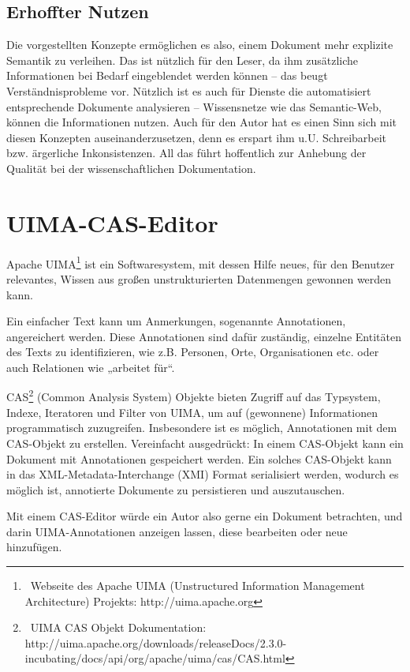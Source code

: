 \subsection{Erhoffter Nutzen}\label{}
 
Die vorgestellten Konzepte ermöglichen es also, einem Dokument mehr explizite Semantik zu verleihen. Das ist nützlich für den Leser, da ihm zusätzliche Informationen bei Bedarf eingeblendet werden können -- das beugt Verständnisprobleme vor. Nützlich ist es auch für Dienste die automatisiert entsprechende Dokumente analysieren -- Wissensnetze wie das Semantic-Web, können die Informationen nutzen. Auch für den Autor hat es einen Sinn sich mit diesen Konzepten auseinanderzusetzen, denn es erspart ihm u.U. Schreibarbeit bzw. ärgerliche Inkonsistenzen. All das führt hoffentlich zur Anhebung der Qualität bei der wissenschaftlichen Dokumentation.

 
\section{UIMA-CAS-Editor}\label{uima-cas-kapitel}
 
Apache UIMA\footnote{~Webseite des Apache UIMA (Unstructured Information Management Architecture) Projekts: http://uima.apache.org } ist ein Softwaresystem, mit dessen Hilfe neues, für den Benutzer relevantes, Wissen aus großen unstrukturierten Datenmengen gewonnen werden kann.

 
Ein einfacher Text kann um Anmerkungen, sogenannte Annotationen, angereichert werden. Diese Annotationen sind dafür zuständig, einzelne Entitäten des Texts zu identifizieren, wie z.B. Personen, Orte, Organisationen etc. oder auch Relationen wie „arbeitet für“.

 
CAS\footnote{~UIMA CAS Objekt Dokumentation: http://uima.apache.org/downloads/releaseDocs/2.3.0-incubating/docs/api/org/apache/uima/cas/CAS.html} (Common Analysis System) Objekte bieten Zugriff auf das Typsystem, Indexe, Iteratoren und Filter von UIMA, um auf (gewonnene) Informationen programmatisch zuzugreifen. Insbesondere ist es möglich, Annotationen mit dem CAS-Objekt zu erstellen. Vereinfacht ausgedrückt: In einem CAS-Objekt kann ein Dokument mit Annotationen gespeichert werden. Ein solches CAS-Objekt kann in das XML-Metadata-Interchange (XMI) Format serialisiert werden, wodurch es möglich ist, annotierte Dokumente zu persistieren und auszutauschen.

 
Mit einem CAS-Editor würde ein Autor also gerne ein Dokument betrachten, und darin UIMA-Annotationen anzeigen lassen, diese bearbeiten oder neue hinzufügen.

